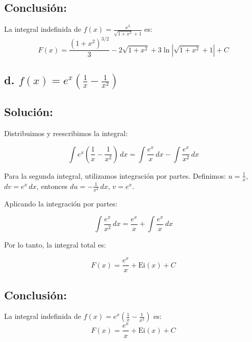 \documentclass{article}
\begin{document}
\subsection*{Conclusión:}

La integral indefinida de \( f(x) = \frac{x^3}{\sqrt{1+x^2} + 1} \) es:
\[
F(x) = \frac{(1+x^2)^{3/2}}{3} - 2\sqrt{1+x^2} + 3 \ln|\sqrt{1+x^2} + 1| + C
\]

\subsection*{\newline d. \(f(x) = e^x \left( \frac{1}{x} - \frac{1}{x^2} \right)\)}
\subsection*{Solución: }

Distribuimos y reescribimos la integral:

\[
\int e^x \left( \frac{1}{x} - \frac{1}{x^2} \right) \, dx = \int \frac{e^x}{x} \, dx - \int \frac{e^x}{x^2} \, dx
\]

\noindent \newline Para la segunda integral, utilizamos integración por partes. Definimos: \( u = \frac{1}{x} \), \( dv = e^x \, dx \), entonces \( du = -\frac{1}{x^2} \, dx \), \( v = e^x \).

\noindent \newline Aplicando la integración por partes:

\[
\int \frac{e^x}{x^2} \, dx = \frac{e^x}{x} + \int \frac{e^x}{x} \, dx
\]

\noindent Por lo tanto, la integral total es:

\[
F(x) = \frac{e^x}{x} + \text{Ei}(x) + C
\]

\subsection*{Conclusión:}

La integral indefinida de \( f(x) = e^x \left( \frac{1}{x} - \frac{1}{x^2} \right) \) es:
\[
F(x) = \frac{e^x}{x} + \text{Ei}(x) + C
\]
\end{document}
